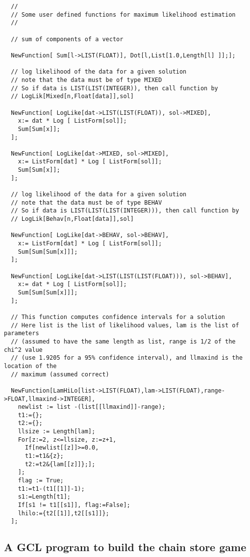 {\scriptsize
\begin{verbatim}
  //
  // Some user defined functions for maximum likelihood estimation
  // 

  // sum of components of a vector

  NewFunction[ Sum[l->LIST(FLOAT)], Dot[l,List[1.0,Length[l] ]];];

  // log likelihood of the data for a given solution
  // note that the data must be of type MIXED
  // So if data is LIST(LIST(INTEGER)), then call function by  
  // LogLik[Mixed[n,Float[data]],sol]

  NewFunction[ LogLike[dat->LIST(LIST(FLOAT)), sol->MIXED], 
    x:= dat * Log [ ListForm[sol]];
    Sum[Sum[x]];
  ];

  NewFunction[ LogLike[dat->MIXED, sol->MIXED], 
    x:= ListForm[dat] * Log [ ListForm[sol]];
    Sum[Sum[x]];
  ];

  // log likelihood of the data for a given solution
  // note that the data must be of type BEHAV
  // So if data is LIST(LIST(LIST(INTEGER))), then call function by  
  // LogLik[Behav[n,Float[data]],sol]

  NewFunction[ LogLike[dat->BEHAV, sol->BEHAV], 
    x:= ListForm[dat] * Log [ ListForm[sol]];
    Sum[Sum[Sum[x]]];
  ];

  NewFunction[ LogLike[dat->LIST(LIST(LIST(FLOAT))), sol->BEHAV], 
    x:= dat * Log [ ListForm[sol]];
    Sum[Sum[Sum[x]]];
  ];

  // This function computes confidence intervals for a solution
  // Here list is the list of likelihood values, lam is the list of parameters
  // (assumed to have the same length as list, range is 1/2 of the chi^2 value
  // (use 1.9205 for a 95% confidence interval), and llmaxind is the location of the 
  // maximum (assumed correct) 

  NewFunction[LamHiLo[list->LIST(FLOAT),lam->LIST(FLOAT),range->FLOAT,llmaxind->INTEGER], 
    newlist := list -(list[[llmaxind]]-range);
    t1:={};
    t2:={};
    llsize := Length[lam];
    For[z:=2, z<=llsize, z:=z+1,
      If[newlist[[z]]>=0.0, 
      t1:=t1&{z}; 
      t2:=t2&{lam[[z]]};];
    ];
    flag := True;
    t1:=t1-(t1[[1]]-1);
    s1:=Length[t1];
    If[s1 != t1[[s1]], flag:=False];
    lhilo:={t2[[1]],t2[[s1]]};
  ];
\end{verbatim}
}

\newpage




\newpage
\subsection{A GCL program to build the chain store game}

